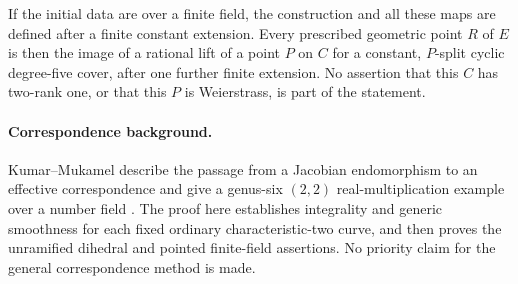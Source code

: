 \documentclass[11pt,a4paper]{article}
\begin{document}
If the initial data are over a finite field, the construction and
all these maps are defined after a finite constant extension.
Every prescribed geometric point $R$ of $E$ is then the image of
a rational lift of a point $P$ on $C$ for a constant, $P$-split
cyclic degree-five cover, after one further finite extension.
No assertion that this $C$ has two-rank one, or that this $P$ is
Weierstrass, is part of the statement.

\paragraph{Correspondence background.}
Kumar--Mukamel describe the passage from a Jacobian endomorphism
to an effective correspondence and give a genus-six $(2,2)$
real-multiplication example over a number field
\cite[Sections~2--3, pp.~5--7]{KumarMukamel2016}.
The proof here establishes integrality and generic smoothness
for each fixed ordinary characteristic-two curve, and then
proves the unramified dihedral and pointed finite-field
assertions. No priority claim for the general correspondence
method is made.
\end{document}
